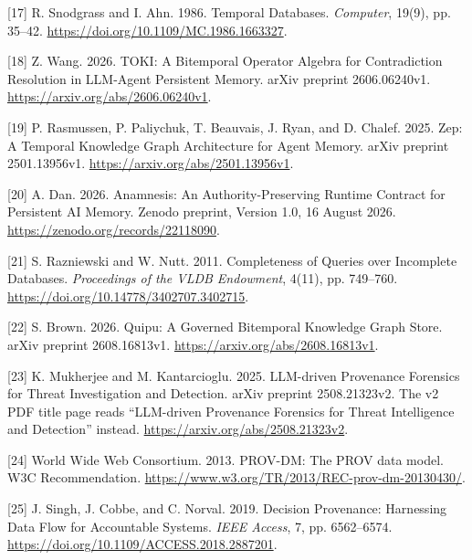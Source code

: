 \documentclass[
  11pt,
]{article}
\newlength{\cslhangindent}
\newlength{\cslentryspacingunit} %
\newenvironment{CSLReferences}[2] %
 {%
  \setlength{\parindent}{0pt}
  \ifodd #1
  \let\oldpar\par
  \def\par{\hangindent=\cslhangindent\oldpar}
  \fi
  \setlength{\parskip}{#2\cslentryspacingunit}
 }%
 {}
\begin{document}
\begin{CSLReferences}{1}{1}
\leavevmode{}%
{[}17{]} R. Snodgrass and I. Ahn. 1986. Temporal Databases.
\emph{Computer}, 19(9), pp. 35--42.
\url{https://doi.org/10.1109/MC.1986.1663327}.

\leavevmode{}%
{[}18{]} Z. Wang. 2026. TOKI: A Bitemporal Operator Algebra for
Contradiction Resolution in LLM-Agent Persistent Memory. arXiv preprint
2606.06240v1. \url{https://arxiv.org/abs/2606.06240v1}.

\leavevmode{}%
{[}19{]} P. Rasmussen, P. Paliychuk, T. Beauvais, J. Ryan, and D.
Chalef. 2025. Zep: A Temporal Knowledge Graph Architecture for Agent
Memory. arXiv preprint 2501.13956v1.
\url{https://arxiv.org/abs/2501.13956v1}.

\leavevmode{}%
{[}20{]} A. Dan. 2026. Anamnesis: An Authority-Preserving Runtime
Contract for Persistent AI Memory. Zenodo preprint, Version 1.0, 16
August 2026. \url{https://zenodo.org/records/22118090}.

\leavevmode{}%
{[}21{]} S. Razniewski and W. Nutt. 2011. Completeness of Queries over
Incomplete Databases. \emph{Proceedings of the VLDB Endowment}, 4(11),
pp. 749--760. \url{https://doi.org/10.14778/3402707.3402715}.

\leavevmode{}%
{[}22{]} S. Brown. 2026. Quipu: A Governed Bitemporal Knowledge Graph
Store. arXiv preprint 2608.16813v1.
\url{https://arxiv.org/abs/2608.16813v1}.

\leavevmode{}%
{[}23{]} K. Mukherjee and M. Kantarcioglu. 2025. LLM-driven Provenance
Forensics for Threat Investigation and Detection. arXiv preprint
2508.21323v2. The v2 PDF title page reads ``LLM-driven Provenance
Forensics for Threat Intelligence and Detection'' instead.
\url{https://arxiv.org/abs/2508.21323v2}.

\leavevmode{}%
{[}24{]} World Wide Web Consortium. 2013. PROV-DM: The PROV data model.
W3C Recommendation.
\url{https://www.w3.org/TR/2013/REC-prov-dm-20130430/}.

\leavevmode{}%
{[}25{]} J. Singh, J. Cobbe, and C. Norval. 2019. Decision Provenance:
Harnessing Data Flow for Accountable Systems. \emph{IEEE Access}, 7, pp.
6562--6574. \url{https://doi.org/10.1109/ACCESS.2018.2887201}.


\end{CSLReferences}
\end{document}
